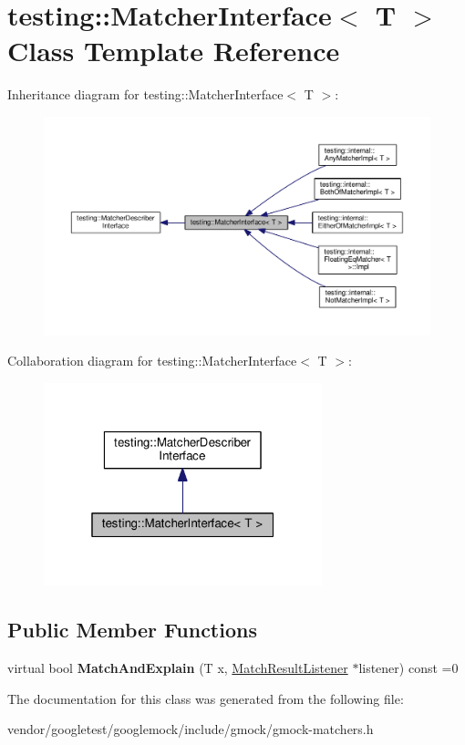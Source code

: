 \hypertarget{classtesting_1_1MatcherInterface}{}\section{testing\+:\+:Matcher\+Interface$<$ T $>$ Class Template Reference}
\label{classtesting_1_1MatcherInterface}


Inheritance diagram for testing\+:\+:Matcher\+Interface$<$ T $>$\+:\nopagebreak
\begin{figure}[H]
\begin{center}
\leavevmode
\includegraphics[width=350pt]{classtesting_1_1MatcherInterface__inherit__graph}
\end{center}
\end{figure}


Collaboration diagram for testing\+:\+:Matcher\+Interface$<$ T $>$\+:\nopagebreak
\begin{figure}[H]
\begin{center}
\leavevmode
\includegraphics[width=229pt]{classtesting_1_1MatcherInterface__coll__graph}
\end{center}
\end{figure}
\subsection*{Public Member Functions}
\begin{DoxyCompactItemize}
\item 
virtual bool {\bfseries Match\+And\+Explain} (T x, \hyperlink{classtesting_1_1MatchResultListener}{Match\+Result\+Listener} $\ast$listener) const =0\hypertarget{classtesting_1_1MatcherInterface_a296b43607cd99d60365f0e6a762777cf}{}\label{classtesting_1_1MatcherInterface_a296b43607cd99d60365f0e6a762777cf}

\end{DoxyCompactItemize}


The documentation for this class was generated from the following file\+:\begin{DoxyCompactItemize}
\item 
vendor/googletest/googlemock/include/gmock/gmock-\/matchers.\+h\end{DoxyCompactItemize}
